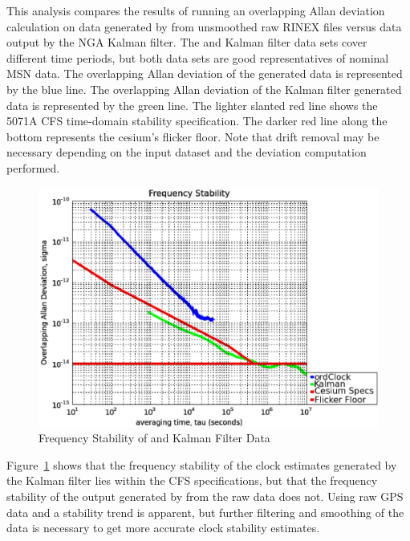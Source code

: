 This analysis compares the results of running an overlapping Allan
deviation calculation on data generated by  from
unsmoothed raw RINEX files versus data output by the NGA Kalman
filter. The  and Kalman filter data sets cover
different time periods, but both data sets are good representatives of
nominal MSN data. The overlapping Allan deviation of the 
generated data is represented by the blue line.  The overlapping Allan
deviation of the Kalman filter generated data is represented by the
green line.  The lighter slanted red line shows the 5071A CFS
time-domain stability specification.  The darker red line along the
bottom represents the cesium’s flicker floor.  Note that drift removal
may be necessary depending on the input dataset and the deviation
computation performed.
%
\begin{figure}
  \centering
  \includegraphics[width=5in,bb=65 387 547 727]{clockapps.eps}
  \caption{Frequency Stability of  and Kalman Filter Data}
  \label{fig:clockapps}
\end{figure}
%
Figure~\ref{fig:clockapps} shows that the frequency stability of the
clock estimates generated by the Kalman filter lies within the CFS
specifications, but that the frequency stability of the output
generated by  from the raw data does not.  Using
raw GPS data and  a stability trend is apparent,
but further filtering and smoothing of the data is necessary to get
more accurate clock stability estimates.
